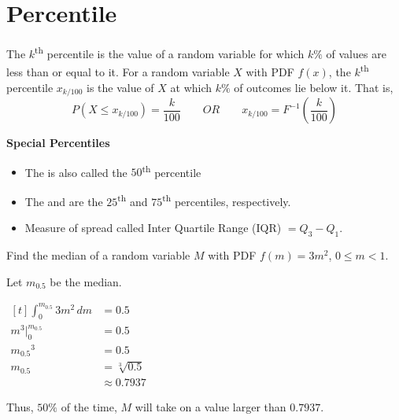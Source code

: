 
\section{Percentile}

\begin{definition}[Percentile]
    The $k$\textsuperscript{th} percentile is the value of a random variable for which $k\%$ of values are less than or equal to it. For a random variable $X$ with PDF $f(x)$, the $k$\textsuperscript{th} percentile $x_{k/100}$ is the value of $X$ at which $k\%$ of outcomes lie below it. That is, $$P(X \le x_{k/100}) = \frac{k}{100} \qquad OR \qquad x_{k/100} = F^{-1} \left( \frac{k}{100} \right)$$
\end{definition}

\textbf{Special Percentiles}

\begin{itemize}
    \item The  is also called the $50$\textsuperscript{th} percentile
    \item The  and  are the $25$\textsuperscript{th} and $75$\textsuperscript{th} percentiles, respectively. 
    \item Measure of spread called \textrm{Inter Quartile Range} (IQR) $ = Q_3 - Q_1$. 
\end{itemize}

\begin{example}
    Find the median of a random variable $M$ with PDF $f(m) = 3m^2$, $0 \le m < 1$. 

    Let $m_{0.5}$ be the median. 

    $\begin{aligned}[t]
        \int_{0}^{m_{0.5}} 3m^2 \,dm & = 0.5           \\
        m^3 \bigg|_{0}^{m_{0.5}}     & = 0.5           \\
        {m_{0.5}}^3                  & = 0.5           \\
        m_{0.5}                      & = \sqrt[3]{0.5} \\
                                     & \approx 0.7937
    \end{aligned}$

    Thus, $50\%$ of the time, $M$ will take on a value larger than $0.7937$.
\end{example}


